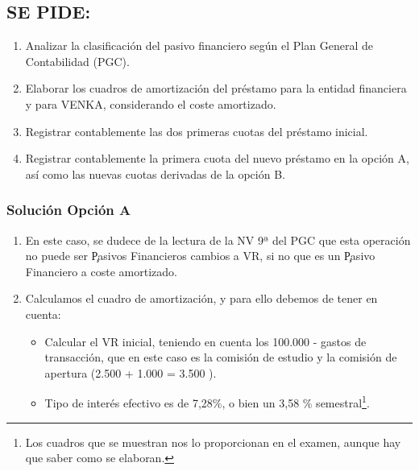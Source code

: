 \subsection*{SE PIDE:}

\begin{enumerate}
    \item Analizar la clasificación del pasivo financiero según el Plan General de Contabilidad (PGC).
    \item Elaborar los cuadros de amortización del préstamo para la entidad financiera y para VENKA, considerando el coste amortizado.
    \item Registrar contablemente las dos primeras cuotas del préstamo inicial.
    \item Registrar contablemente la primera cuota del nuevo préstamo en la opción A, así como las nuevas cuotas derivadas de la opción B.
\end{enumerate}

\subsubsection*{Solución Opción A}

\begin{enumerate}
    \item En este caso, se dudece de la lectura de la NV 9ª del PGC que esta operación no puede ser \c{Pasivos Financieros cambios a VR}, si no que es un \c{Pasivo Financiero a coste amortizado}.
    \item Calculamos el cuadro de amortización, y para ello debemos de tener en cuenta:
    \begin{itemize}
        \item Calcular el VR inicial, teniendo en cuenta los 100.000 \e - gastos de transacción, que en este caso es la comisión de estudio y la comisión de apertura (2.500 + 1.000 = 3.500 \e).
        \item Tipo de interés efectivo es de 7,28\%, o bien un 3,58 \% semestral\footnote{Los cuadros que se muestran nos lo proporcionan en el examen, aunque hay que saber como se elaboran.}.
    \end{itemize}
\end{enumerate}


